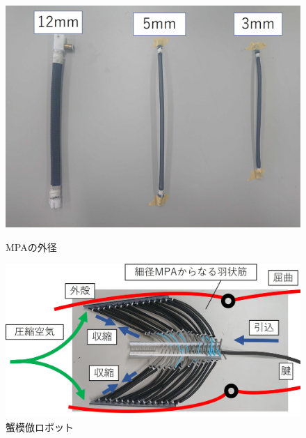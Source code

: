 \documentclass{jarticle}
\begin{document}
\begin{figure}[H]
  \begin{minipage}[b]{0.47\columnwidth}
    \centering
    \includegraphics[scale=0.13]{mpa.JPG}
    \vspace{-4mm}
    \caption{MPAの外径}
    \label{fig:MPA}
  \end{minipage}
  \hspace{0.04\columnwidth}
  \begin{minipage}[b]{0.47\columnwidth}
    \centering
    \includegraphics[scale=0.2]{mosiki.JPG}
    \vspace{-6mm}
    \caption{蟹模倣ロボット\cite{crabrobot2}}
    \label{fig:crabrobot}
  \end{minipage}
\end{figure}
\vspace*{-5mm}
\end{document}
